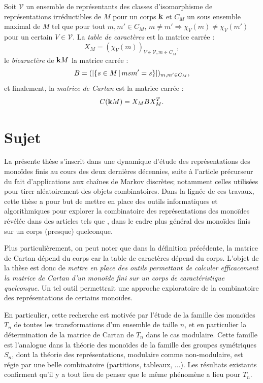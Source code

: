 \documentclass{article}
\begin{document}
	\begin{dftn}\label{def:cartan}
		Soit $\mathcal{V}$ un ensemble de représentants des classes d'isomorphisme 
		de représentations irréductibles de $M$ pour un corps $\mathbf{k}$ et $C_M$ un 
		sous ensemble maximal de $M$ tel que pour tout $m, m' \in C_M$, $m \neq m' 
		\Rightarrow \chi_V(m)\neq \chi_V(m')$ pour un certain $V \in \mathcal{V}$. 
		La \emph{table de caractères} est la matrice carrée :
		\[X_M = (\chi_V(m))_{V \in \mathcal{V}, m \in C_M},\]
		le \emph{bicaractère} de $\mathbf{k} M$ la matrice carrée :
		\[B = (|\{s \in M \,\vert\, msm' = s\}|)_{m, m' \in C_M},\]
		et finalement, la \emph{matrice de Cartan} est la matrice carrée :
		\[C(\mathbf{k} M) = X_M B X_M^T.\]
	\end{dftn}
	
	\section*{Sujet}
	
	La présente thèse s'inscrit dans une dynamique d'étude des représentations 
	des monoïdes finis au cours des deux dernières décennies, suite à l'article précurseur~\cite{Brown.2000} du fait d'applications aux chaînes de Markov 
	discrètes; notamment celles utilisées pour tirer aléatoirement des objets 
	combinatoires. Dans la lignée de ces travaux, cette thèse a pour but de 
	mettre en place des outils informatiques et algorithmiques pour explorer la 
	combinatoire des représentations des monoïdes révélée dans des articles tels 
	que \cite{Brown.2000,AyyerSchillingSteinbergThiery.2014.RTrivivalMarkovChains,AyyerSchillingThiery.2014.SpectralGap}, dans le cadre plus général des monoïdes finis sur un
	corps (presque) quelconque.
	
	Plus particulièrement, on peut noter que dans la définition précédente, la 
	matrice de Cartan dépend du corps car la table de caractères dépend du corps.
	L'objet de la thèse est donc de \emph{mettre en place des outils permettant de 
	calculer efficacement la matrice de Cartan d'un monoïde fini sur un corps de 
	caractéristique quelconque}. Un tel outil permettrait une approche 
	exploratoire de la combinatoire des représentations de certains monoïdes.
	
	En particulier, cette recherche est motivée par l'étude de la famille des 
	monoïdes $T_n$ de toutes les transformations d'un ensemble de taille $n$, 
	et en particulier la détermination de la matrice de Cartan de $T_n$ dans 
	le cas modulaire. Cette famille est l'analogue dans la théorie des monoïdes 
	de la famille des groupes symétriques $S_n$, dont la théorie des représentations, modulaire comme non-modulaire, est régie par une belle combinatoire 
	(partitions, tableaux, ...). Les résultats 	existants confirment qu'il y a 
	tout lieu de penser que le même phénomène a lieu pour $T_n$.
	
\end{document}

